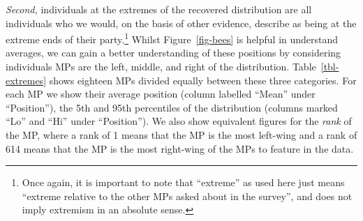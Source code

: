 \documentclass[
]{article}
\begin{document}
\emph{Second,} individuals at the extremes of the recovered distribution
are all individuals who we would, on the basis of other evidence,
describe as being at the extreme ends of their party.\footnote{Once
  again, it is important to note that ``extreme'' as used here just
  means ``extreme relative to the other MPs asked about in the survey'',
  and does not imply extremism in an absolute sense.} Whilst
Figure~\ref{fig-bees} is helpful in understand averages, we can gain a
better understanding of these positions by considering individuals MPs
are the left, middle, and right of the distribution.
Table~\ref{tbl-extremes} shows eighteen MPs divided equally between
these three categories. For each MP we show their average position
(column labelled ``Mean'' under ``Position''), the 5th and 95th
percentiles of the distribution (columns marked ``Lo'' and ``Hi'' under
``Position''). We also show equivalent figures for the \emph{rank} of
the MP, where a rank of 1 means that the MP is the most left-wing and a
rank of 614 means that the MP is the most right-wing of the MPs to
feature in the data.
\end{document}

